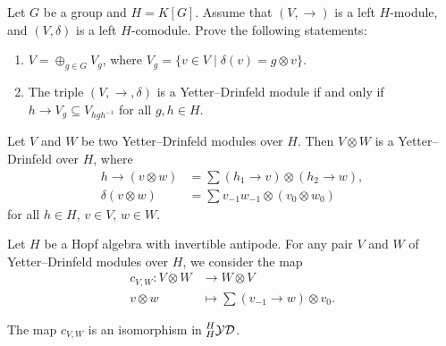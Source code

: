 \documentclass[12pt]{amsproc}
\newcommand{\ydH}{\prescript{H}{H}{\mathcal{YD}}}
\begin{document}
\begin{exercise}
Let $G$ be a group and $H=K[G]$. Assume that
$(V,\rightarrow)$ is a left $H$-module, and $(V,\delta)$ is a left
$H$-comodule. Prove the following statements:
\begin{enumerate}
\item $V=\oplus_{g\in G}V_{g}$, where $V_{g}=\{v\in V\mid\delta(v)=g\otimes v\}$.  
\item The triple $(V,\rightarrow,\delta)$ is a Yetter--Drinfeld
module if and only if $h\rightarrow V_{g}\subseteq V_{hgh^{-1}}$ for all
$g,h\in H$.
\end{enumerate}
\end{exercise}

\begin{exercise}\label{xca:YD_tensor}
Let $V$ and $W$ be two Yetter--Drinfeld modules over $H$. Then $V\otimes W$ is a
Yetter--Drinfeld over $H$, where 
\begin{align*}
h\rightarrow(v\otimes w) & =\sum (h_{1}\rightarrow v)\otimes(h_{2}\rightarrow w),\\
\delta(v\otimes w) & =\sum v_{-1}w_{-1}\otimes(v_{0}\otimes w_{0})
\end{align*}
for all $h\in H$, $v\in V$, $w\in W$.
\end{exercise}

Let $H$ be a Hopf algebra with invertible antipode. For any pair $V$ and $W$ of
Yetter--Drinfeld modules over $H$, we consider the map 
\begin{align*}
c_{V,W}\colon V\otimes W&\to W\otimes V\\
v\otimes w&\mapsto \sum (v_{-1}\rightarrow w)\otimes v_{0}.
\end{align*}

\begin{proposition}
The map $c_{V,W}$ is an isomorphism in $\ydH$.
\end{proposition}
\end{document}
